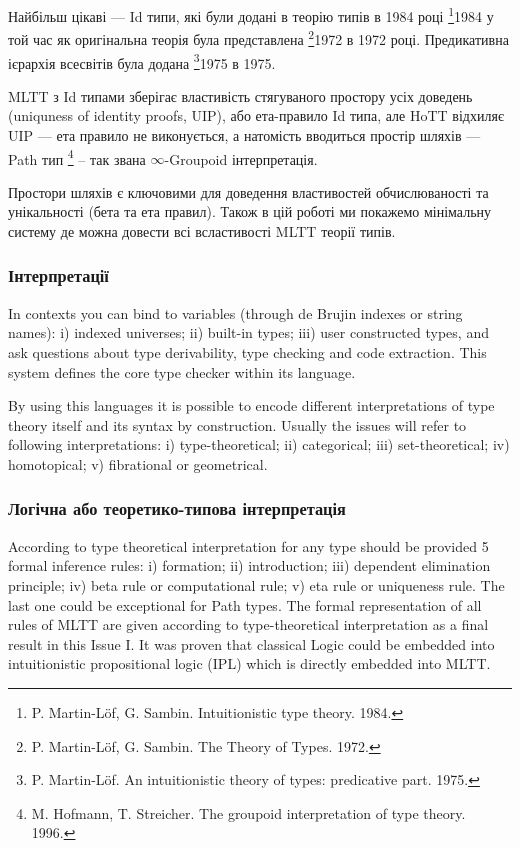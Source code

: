 Найбільш цікаві --- Id типи, які були додані в теорію типів в 1984 році
\footnote{P. Martin-Löf, G. Sambin. Intuitionistic type theory. 1984.}{1984}
у той час як оригінальна теорія була представлена
\footnote{P. Martin-Löf, G. Sambin. The Theory of Types. 1972.}{1972} в 1972 році.
Предикативна ієрархія всесвітів була додана \footnote{P. Martin-Löf. An intuitionistic theory of types: predicative part. 1975.}{1975} в 1975.

MLTT з Id типами зберігає властивість стягуваного простору усіх доведень (uniquness of identity
proofs, UIP), або ета-правило Id типа, але HoTT відхиляє UIP --- ета правило
не виконується, а натомість вводиться простір шляхів --- Path тип \footnote{M. Hofmann, T. Streicher. The groupoid interpretation of type theory. 1996.} -- так звана $\infty$-Groupoid інтерпретація.

Простори шляхів є ключовими для доведення властивостей обчислюваності
та унікальності (бета та ета правил). Також в цій роботі ми покажемо
мінімальну систему де можна довести всі всластивості MLTT теорії типів.

\subsubsection{Інтерпретації}
In contexts you can bind to variables (through de Brujin indexes or string names):
i) indexed universes; ii) built-in types; iii) user constructed types, and ask
questions about type derivability, type checking and code extraction. This system
defines the core type checker within its language.

By using this languages it is possible to encode different interpretations of
type theory itself and its syntax by construction. Usually the issues will refer to
following interpretations: i) type-theoretical; ii) categorical;
iii) set-theoretical; iv) homotopical; v) fibrational or geometrical.

\subsubsection*{Логічна або теоретико-типова інтерпретація}
According to type theoretical interpretation for any type should be provided 5 formal
inference rules: i) formation; ii) introduction; iii) dependent elimination principle;
iv) beta rule or computational rule; v) eta rule or uniqueness rule. The last one could
be exceptional for Path types. The formal representation of all rules of MLTT
are given according to type-theoretical interpretation as a final result in this Issue I.
It was proven that classical Logic could be embedded into
intuitionistic propositional logic (IPL) which is directly embedded into MLTT.

